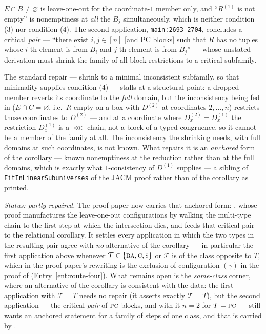 $E\cap B\neq\varnothing$ is leave-one-out for the coordinate-$1$ member
only, and ``$R^{(1)}$ is not empty'' is nonemptiness at \emph{all} the
$B_{j}$ simultaneously, which is neither condition (3) nor condition (4).
The second application, \texttt{main:2693--2704}, concludes a critical
\emph{pair} --- ``there exist $i,j\in[n]$ [and PC blocks] such that $R$ has
no tuples whose $i$-th element is from $B_{i}$ and $j$-th element is from
$B_{j}$'' --- whose unstated derivation must shrink the family of all block
restrictions to a critical subfamily.

The standard repair --- shrink to a minimal inconsistent subfamily, so that
minimality supplies condition (4) --- stalls at a structural point: a
dropped member reverts its coordinate to the \emph{full} domain, but the
inconsistency being fed in ($E\cap C=\varnothing$, i.e.\ $R$ empty on a box
with $D^{(2)}$ at coordinates $2,\dots,n$) restricts those coordinates to
$D^{(2)}$ --- and at a coordinate where $D^{(2)}_{x}=D^{(1)}_{x}$ the
restriction $D^{(1)}_{x}$ is a $\lll$-chain, not a block of a typed
congruence, so it cannot be a member of the family at all. The
inconsistency the shrinking needs, with full domains at such coordinates,
is not known. What repairs it is an \emph{anchored} form of the
corollary --- known nonemptiness at the reduction rather than at the full
domains, which is exactly what $1$-consistency of $D^{(1)}$ supplies ---
a sibling of \texttt{FitInLinearSubuniverses} of the JACM proof rather
than of the corollary as printed.

\emph{Status: partly repaired.} The proof paper now carries that anchored
form: , whose proof manufactures the
leave-one-out configurations by walking the multi-type chain to the first
step at which the intersection dies, and feeds that critical pair to the
relational corollary. It settles every application in which the two types
in the resulting pair agree with \emph{no} alternative of the corollary ---
in particular the first application above whenever $\mathcal
T\in\{\textup{\textsc{ba}},\textup{\textsc{c}},\textup{\textsc{s}}\}$ or $\mathcal T$ is of the class opposite to $T$,
which in the proof paper's rewriting is the exclusion of configuration
$(\gamma)$ in the proof of 
(Entry~\ref{ent:route-four}). What remains open is the \emph{same-class}
corner, where an alternative of the corollary is consistent with the data:
the first application with $\mathcal T=T$ needs no repair (it asserts
exactly $\mathcal T=T$), but the second application --- the critical
\emph{pair} of $\textup{\textsc{pc}}$ blocks, and with it $n=2$ for $T=\textup{\textsc{pc}}$ --- still
wants an anchored statement for a family of steps of one class, and that
is carried by .

